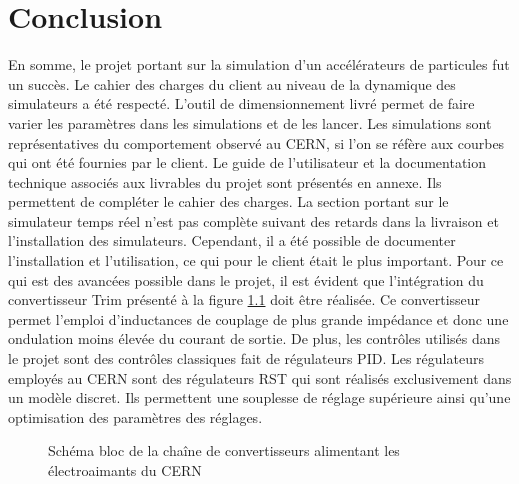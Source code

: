 \chapter{Conclusion}
En somme, le projet portant sur la simulation d'un accélérateurs de particules fut un succès. Le cahier des charges du client au niveau de la dynamique des simulateurs a été respecté. L'outil de dimensionnement livré permet de faire varier les paramètres dans les simulations et de les lancer. Les simulations sont représentatives du comportement observé au CERN, si l'on se réfère aux courbes qui ont été fournies par le client. Le guide de l'utilisateur et la documentation technique associés aux livrables du projet sont présentés en annexe. Ils permettent de compléter le cahier des charges. La section portant sur le simulateur temps réel n'est pas complète suivant des retards dans la livraison et l'installation des simulateurs. Cependant, il a été possible de documenter l'installation et l'utilisation, ce qui pour le client était le plus important. Pour ce qui est des avancées possible dans le projet, il est évident que l'intégration du convertisseur \og Trim \fg{} présenté à la figure \ref{conv_CERN} doit être réalisée. Ce convertisseur permet l'emploi d'inductances de couplage de plus grande impédance et donc une ondulation moins élevée du courant de sortie. De plus, les contrôles utilisés dans le projet sont des contrôles classiques fait de régulateurs PID. Les régulateurs employés au CERN sont des régulateurs RST qui sont réalisés exclusivement dans un modèle discret. Ils permettent une souplesse de réglage supérieure ainsi qu'une optimisation des paramètres des réglages.


\begin{figure}[htb]
\centering
{}
\caption{Schéma bloc de la chaîne de convertisseurs alimentant les électroaimants du CERN}
\label{conv_CERN}
\end{figure}
